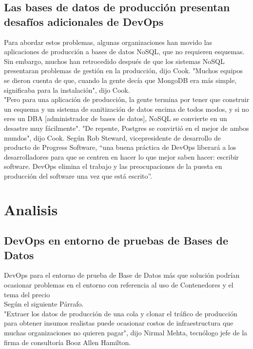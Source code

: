 \documentclass[preprint,12pt]{elsarticle}
\begin{document}
\subsection{Las bases de datos de producción presentan desafíos adicionales de DevOps}
Para abordar estos problemas, algunas organizaciones han movido las aplicaciones de producción a bases de datos NoSQL, que no requieren esquemas. 
Sin embargo, muchos han retrocedido después de que los sistemas NoSQL presentaran problemas de gestión en la producción, dijo Cook.
"Muchos equipos se dieron cuenta de que, cuando la gente decía que MongoDB era más simple, significaba para la instalación", dijo Cook.
\\
 "Pero para una aplicación de producción, la gente termina por tener que construir un esquema y un sistema de sanitización de datos encima de todos modos, y si no eres un DBA [administrador de bases de datos], NoSQL se convierte en un desastre muy fácilmente".
"De repente, Postgres se convirtió en el mejor de ambos mundos", dijo Cook.
Según Rob Steward, vicepresidente de desarrollo de producto de Progress Software, “una buena práctica de DevOps liberará a los desarrolladores para que se centren en hacer lo que mejor saben hacer: escribir software. DevOps elimina el trabajo y las preocupaciones de la puesta en producción del software una vez que está escrito”.


\section{Analisis}
\subsection{DevOps en entorno de pruebas de Bases de Datos}
DevOps para el entorno de prueba de Base de Datos más que solución podrían ocasionar problemas en el entorno con referencia al uso de Contenedores y el tema del precio
\\
Según el siguiente Párrafo.
\\
"Extraer los datos de producción de una cola y clonar el tráfico de producción para obtener insumos realistas puede ocasionar costos de infraestructura que muchas organizaciones no quieren pagar", dijo Nirmal Mehta, tecnólogo jefe de la firma de consultoría Booz Allen Hamilton.
\\
\end{document}
